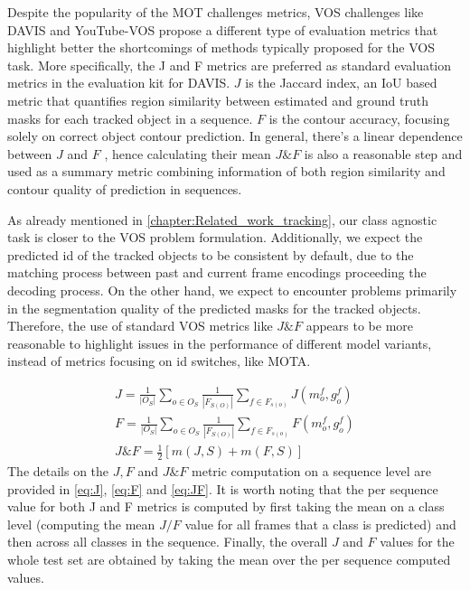 Despite the popularity of the MOT challenges metrics, \gls{VOS}
challenges like DAVIS \parencite{davis} and YouTube-VOS \parencite{youtube-vos} propose a different type of evaluation metrics that highlight better the shortcomings of methods typically proposed for the VOS task. More specifically, the J and F metrics are preferred as standard evaluation metrics in the evaluation kit for DAVIS. $J$ is the Jaccard index, an IoU based metric that quantifies region similarity between estimated and ground truth masks for each tracked object in a sequence. $F$ is the contour accuracy, focusing solely on correct object contour prediction. In general, there's a linear dependence between $J$ and $F$ \parencite{davis}, hence calculating their mean $J\&F$ is also a reasonable step and used as a summary metric combining information of both region similarity and contour quality of prediction in sequences. \par

As already mentioned in \autoref{chapter:Related_work_tracking}, our class agnostic task is closer to the VOS problem formulation. Additionally, we expect the predicted id of the tracked objects
to be consistent by default, due to the matching process between past and current frame encodings proceeding the decoding process. On the other hand, we expect to encounter problems primarily in the segmentation quality of the predicted masks for the tracked objects. Therefore, the use of standard VOS metrics like $J\&F$ appears to be more reasonable to highlight issues in the performance of different model variants, instead of metrics focusing on id switches, like MOTA. \par 


\begin{gather}
    J = \frac{1}{|O_S|}\sum_{o \in O_S} \frac{1}{|F_{S(O)}|}\sum_{f \in F_{s(o)}}J(m_o^f, g_o^f) \label{eq:J}\\
    F = \frac{1}{|O_S|}\sum_{o \in O_S} \frac{1}{|F_{S(O)}|}\sum_{f \in F_{s(o)}}F(m_o^f, g_o^f)\label{eq:F}\\
    J\&F = \frac{1}{2}[m(J,S)+m(F,S)] \label{eq:JF}
\end{gather}
\newpage
The details on the $J, F$ and $J\&F$ metric computation on a sequence level are provided in \eqref{eq:J}, \eqref{eq:F} and \eqref{eq:JF}. It is worth noting that the per sequence value for both J and F metrics is computed by first taking the mean on a class level (computing the mean $J/F$ value for all frames that a class is predicted) and then across all classes in the sequence. Finally, the overall $J$ and $F$ values for the whole test set are obtained by taking the mean over the per sequence computed values.


